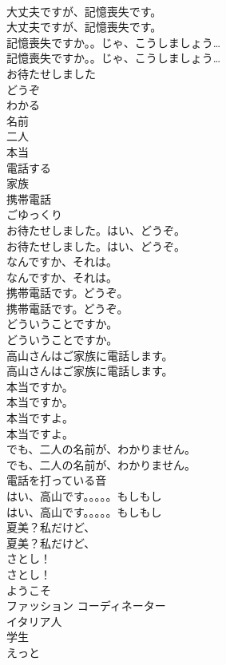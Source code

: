 \documentclass[8pt]{extreport}
\begin{document}
\begin{CJK}{UTF8}{min}
\\	大丈夫ですが、記憶喪失です。	
\\	大丈夫ですが、記憶喪失です。 
\\	記憶喪失ですか。。じゃ、こうしましょう…	
\\	記憶喪失ですか。。じゃ、こうしましょう… 
\\	お待たせしました
\\	どうぞ
\\	わかる
\\	名前
\\	二人
\\	本当
\\	電話する
\\	家族
\\	携帯電話
\\	ごゆっくり
\\	お待たせしました。はい、どうぞ。	
\\	お待たせしました。はい、どうぞ。 
\\	なんですか、それは。	
\\	なんですか、それは。 
\\	携帯電話です。どうぞ。	
\\	携帯電話です。どうぞ。 
\\	どういうことですか。	
\\	どういうことですか。 
\\	高山さんはご家族に電話します。	
\\	高山さんはご家族に電話します。 
\\	本当ですか。	
\\	本当ですか。 
\\	本当ですよ。	
\\	本当ですよ。 
\\	でも、二人の名前が、わかりません。	
\\	でも、二人の名前が、わかりません。 
\\	電話を打っている音	
\\	はい、高山です。。。。。もしもし	
\\	はい、高山です。。。。。もしもし 
\\	夏美？私だけど、	
\\	夏美？私だけど、 
\\	さとし！	
\\	さとし！ 
\\	ようこそ
\\	ファッション コーディネーター
\\	イタリア人
\\	学生
\\	えっと

\end{CJK}
\end{document}

